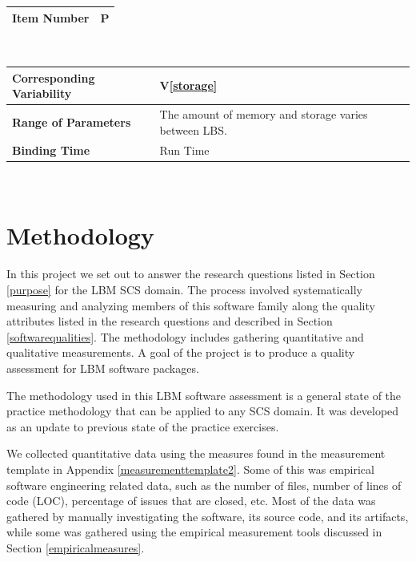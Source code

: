 \documentclass[12pt, notitlepage]{article}
\newcommand{\colEwidth}{0.33\textwidth}
\newcommand{\colFwidth}{0.67\textwidth}
\newcommand{\vref}[1]{V\ref{#1}}
\newcounter{parnum} %
\begin{document}
\begin{minipage}{\textwidth}
	\renewcommand*{\arraystretch}{1.5}
	\begin{tabular}{| p{\colEwidth} | p{\colFwidth}|}
		\hline
		\bf Item Number& P{parnum}\theparnum\label{parstorageconst} \\
		\hline
	\end{tabular}\\
	
	\begin{tabular}{| p{\colEwidth} | p{\colFwidth}|}		
		\hline
		\bf Corresponding Variability & \vref{storage}\\
		\hline
		\bf Range of Parameters & The amount of memory and storage varies between LBS.\\
		\hline
		\bf Binding Time & Run Time\\
		\hline
	\end{tabular}
\end{minipage}\\

\newpage
\section{Methodology}

In this project we set out to answer the research questions listed in Section \ref{purpose} for the LBM SCS domain. The process involved systematically measuring and analyzing members of this software family along the quality attributes listed in the research questions and described in Section \ref{softwarequalities}. The methodology includes gathering quantitative and qualitative measurements. A goal of the project is to produce a quality assessment for LBM software packages.  

The methodology used in this LBM software assessment is a general state of the practice methodology that can be applied to any SCS domain. It was developed as an update to previous state of the practice exercises. 

We collected quantitative data using the measures found in the measurement template in Appendix \ref{measurementtemplate2}. Some of this was empirical software engineering related data, such as the number of files, number of lines of code (LOC), percentage of issues that are closed, etc. Most of the data was gathered by manually investigating the software, its source code, and its artifacts, while some was gathered using the empirical measurement tools discussed in Section \ref{empiricalmeasures}.
\end{document}
